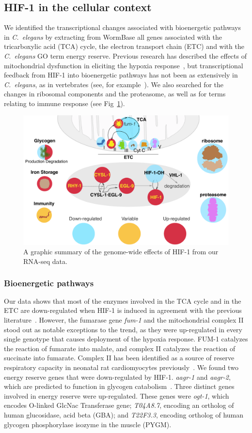 \documentclass[10pt, onecolumn]{article}
\newcommand{\cel}{\emph{C.~elegans}}
\newcommand{\gene}[1]{\emph{#1}}
\newcommand{\hifp}{HIF-1}
\begin{document}
\subsection*{\hifp{} in the cellular context}
\label{sub:metabolism}

We identified the transcriptional changes
associated with bioenergetic pathways in \cel{} by extracting from
WormBase all genes associated with the tricarboxylic acid (TCA) cycle, the
electron transport chain (ETC) and with the \cel{} GO term energy reserve.
Previous research has described the effects of mitochondrial dysfunction in
eliciting the hypoxia response~\cite{Lee2010}, but transcriptional feedback
from \hifp{} into bioenergetic pathways has not been as extensively in \cel{},
as in vertebrates (see, for example~\cite{Semenza1994,Semenza2012}).
We also searched for the changes in ribosomal components and the proteasome, as
well as for terms relating to immune response (see Fig~\ref{fig:genomewide}).

\begin{figure}[tbhp]
\centering
\includegraphics[width=.7\linewidth]{../figs/hif1genomewide.pdf}
\caption{
A graphic summary of the genome-wide effects of \hifp{} from our RNA-seq data.
}
\label{fig:genomewide}
\end{figure}

\subsubsection*{Bioenergetic pathways}
Our data shows that most of the enzymes involved in the TCA cycle and in the ETC
are down-regulated when \hifp{} is induced in agreement with the previous
literature~\cite{Semenza2012}.
However, the fumarase gene \gene{fum-1} and the mitochondrial complex II stood out as notable
exceptions to the trend, as they were up-regulated in every single genotype that
causes deployment of the hypoxia response. FUM-1 catalyzes the reaction
of fumarate into malate, and complex II catalyzes the reaction of succinate into
fumarate. Complex II has been identified as a source of reserve respiratory
capacity in neonatal rat cardiomyocytes previously~\cite{Pfleger2015}.
We found two energy reserve genes that were down-regulated by \hifp{}.
\gene{aagr-1} and \gene{aagr-2}, which are predicted to function in glycogen
catabolism~\cite{Sikora2010}.
Three distinct genes involved in energy reserve were up-regulated. These genes were
\gene{ogt-1}, which encodes O-linked GlcNac Transferase gene; \gene{T04A8.7},
encoding an ortholog of human glucosidase, acid beta (GBA); and \gene{T22F3.3},
encoding ortholog of human glycogen phosphorylase isozyme in the muscle (PYGM).
\end{document}
